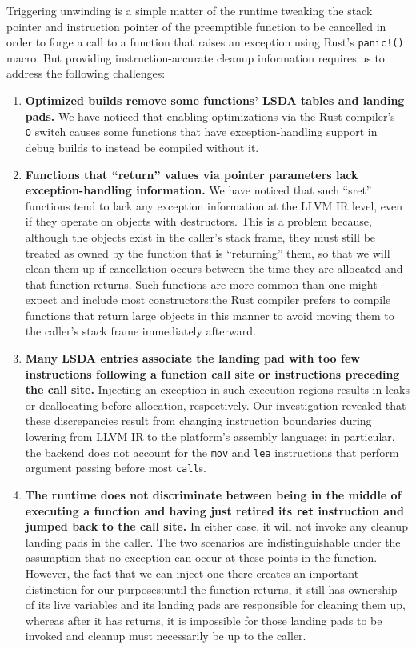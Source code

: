Triggering unwinding is a simple matter of the runtime tweaking the stack pointer and
instruction pointer of the preemptible function to be cancelled in order to forge a
call to a function that raises an exception using Rust's \texttt{panic!()} macro.
But providing instruction-accurate cleanup information requires us to address the
following challenges:
\begin{enumerate}
\item \textbf{Optimized builds remove some functions' LSDA tables and landing pads.}
We have noticed that enabling optimizations via the Rust compiler's \texttt{-O}
switch causes some functions that have exception-handling support in debug builds to
instead be compiled without it.

\item \textbf{Functions that ``return'' values via pointer parameters lack
exception-handling information.}  We have noticed that such ``sret'' functions tend
to lack any exception information at the LLVM IR level, even if they operate on
objects with destructors.  This is a problem because, although the objects exist in
the caller's stack frame, they must still be treated as owned by the function that is
``returning'' them, so that we will clean them up if cancellation occurs between the
time they are allocated and that function returns.  Such functions are more common
than one might expect and include most constructors:\@ the Rust compiler prefers to
compile functions that return large objects in this manner to avoid moving them to
the caller's stack frame immediately afterward.

\item \textbf{Many LSDA entries associate the landing pad with too few instructions
following a function call site or instructions preceding the call site.}  Injecting
an exception in such execution regions results in leaks or deallocating before
allocation, respectively.  Our investigation revealed that these discrepancies result
from changing instruction boundaries during lowering from LLVM IR to the platform's
assembly language; in particular, the backend does not account for the \texttt{mov}
and \texttt{lea} instructions that perform argument passing before most
\texttt{call}s.

\item \textbf{The runtime does not discriminate between being in the middle of
executing a function and having just retired its \texttt{ret} instruction and jumped
back to the call site.}  In either case, it will not invoke any cleanup landing pads
in the caller.  The two scenarios are indistinguishable under the assumption that no
exception can occur at these points in the function.  However, the fact that we can
inject one there creates an important distinction for our purposes:\@ until the
function returns, it still has ownership of its live variables and its landing pads
are responsible for cleaning them up, whereas after it has returns, it is impossible
for those landing pads to be invoked and cleanup must necessarily be up to the
caller.


\end{enumerate}
